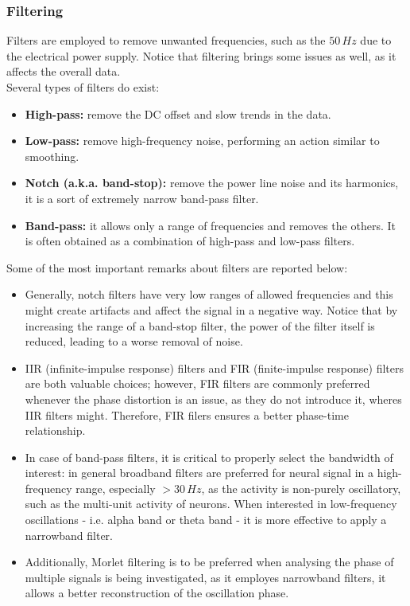 \subsubsection{Filtering}
Filters are employed to remove unwanted frequencies, such as the \(50\,Hz\) due to
the electrical power supply. Notice that filtering brings some issues as well, as it
affects the overall data.\\
Several types of filters do exist:
\begin{itemize}
    \item \textbf{High-pass:} remove the DC offset and slow trends in the data.
    \item \textbf{Low-pass:} remove high-frequency noise, performing an action similar to
    smoothing.
    \item \textbf{Notch (a.k.a. band-stop):} remove the power line noise and its harmonics,
    it is a sort of extremely narrow band-pass filter.
    \item \textbf{Band-pass:} it allows only a range of frequencies and removes the others.
    It is often obtained as a combination of high-pass and low-pass filters.
\end{itemize}
Some of the most important remarks about filters are reported below:
\begin{itemize}
    \item Generally, notch filters have very low ranges of allowed frequencies and
    this might create artifacts and affect the signal in a negative way. Notice
    that by increasing the range of a band-stop filter, the power of the filter itself
    is reduced, leading to a worse removal of noise.
    \item IIR (infinite-impulse response) filters and FIR (finite-impulse response)
    filters are both valuable choices; however, FIR filters are commonly preferred
    whenever the phase distortion is an issue, as they do not introduce it, wheres
    IIR filters might. Therefore, FIR filers ensures a better phase-time relationship.
    \item In case of band-pass filters, it is critical to properly select the
    bandwidth of interest: in general broadband filters are preferred for neural
    signal in a high-frequency range, especially \(>30\,Hz\), as the activity
    is non-purely oscillatory, such as the multi-unit activity of neurons. When
    interested in low-frequency oscillations - i.e. alpha band or theta band - it is
    more effective to apply a narrowband filter.
    \item Additionally, Morlet filtering is to be preferred when analysing the phase
    of multiple signals is being investigated, as it employes narrowband filters, it
    allows a better reconstruction of the oscillation phase.
\end{itemize}
